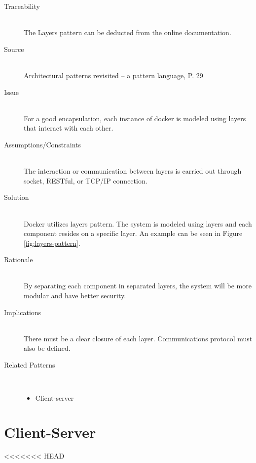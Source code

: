 \begin{description}
\item [Traceability]~\\
The Layers pattern can be deducted from the online documentation\cite{dockerarchi}.

\item [Source]~\\
Architectural patterns revisited -- a pattern language, P. 29 \cite{avgeriou2005architectural}

\item [Issue]~\\
For a good encapsulation, each instance of docker is modeled using layers that interact with each other.

\item [Assumptions/Constraints]~\\
The interaction or communication between layers is carried out through socket, RESTful, or TCP/IP connection.

\item [Solution]~\\
Docker utilizes layers pattern. The system is modeled using layers and each component resides on a specific layer. An example can be seen in Figure \ref{fig:layers-pattern}.

\item [Rationale] ~\\
By separating each component in separated layers, the system will be more modular and have better security.

\item [Implications]~\\
There must be a clear closure of each layer. Communications protocol must also be defined.

\item [Related Patterns]~\\
\begin{itemize}
	\item Client-server
\end{itemize}
\end{description}

\clearpage
\section{Client-Server}
<<<<<<< HEAD

